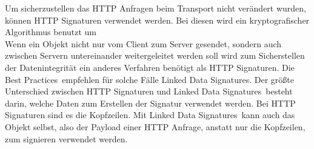 {		
		Um sicherzustellen das HTTP Anfragen beim Transport nicht verändert wurden, können HTTP Signaturen verwendet werden. Bei diesen wird ein kryptografischer Algorithmus benutzt um \\
		
		Wenn ein Objekt nicht nur vom Client zum Server gesendet, sondern auch zwischen Servern untereinander weitergeleitet werden soll wird zum Sicherstellen der Datenintegrität ein anderes Verfahren benötigt als HTTP Signaturen. Die \glqq Best Practices\grqq~empfehlen für solche Fälle \glqq Linked Data Signatures\grqq. Der größte Unterschied zwischen HTTP Signaturen und \glqq Linked Data Signatures\grqq~besteht darin, welche Daten zum Erstellen der Signatur verwendet werden. Bei HTTP Signaturen sind es die Kopfzeilen. Mit \glqq Linked Data Signatures\grqq~kann auch das Objekt selbst, also der Payload einer HTTP Anfrage, anstatt nur die Kopfzeilen, zum signieren verwendet werden.	
	}
	
